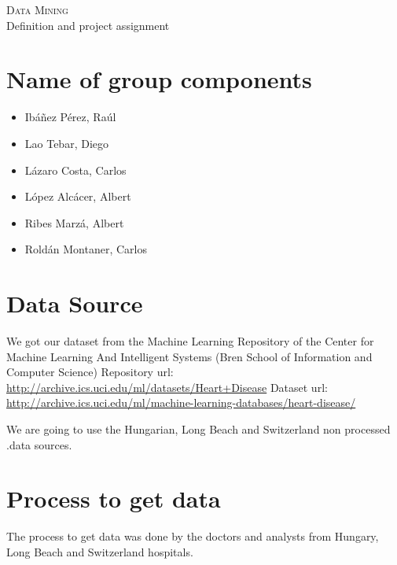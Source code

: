 \documentclass[a4paper,12pt]{article}
\begin{document}
\begin{center}
    \huge{\textsc{Data Mining} \\ Definition and project assignment}
\end{center}


%

\section{Name of group components}

    \begin{itemize}
    
        \item Ibáñez Pérez, Raúl
        \item Lao Tebar, Diego
        \item Lázaro Costa, Carlos
        \item López Alcácer, Albert
        \item Ribes Marzá, Albert
        \item Roldán Montaner, Carlos

    \end{itemize}

\section{Data Source}

    We got our dataset from the Machine Learning Repository of the Center for Machine Learning And Intelligent Systems (Bren School of Information and Computer Science)\newline
    Repository url: \url{http://archive.ics.uci.edu/ml/datasets/Heart+Disease}\newline
    Dataset url: \url{http://archive.ics.uci.edu/ml/machine-learning-databases/heart-disease/} \newline

    We are going to use the Hungarian, Long Beach and Switzerland non processed .data sources.

\section{Process to get data}
    The process to get data was done by the doctors and analysts from Hungary, Long Beach and Switzerland hospitals.
    
\end{document}
